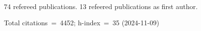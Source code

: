 74 refereed publications. 13 refeered publications as first author.

Total citations~=~4452; h-index~=~35 (2024-11-09)